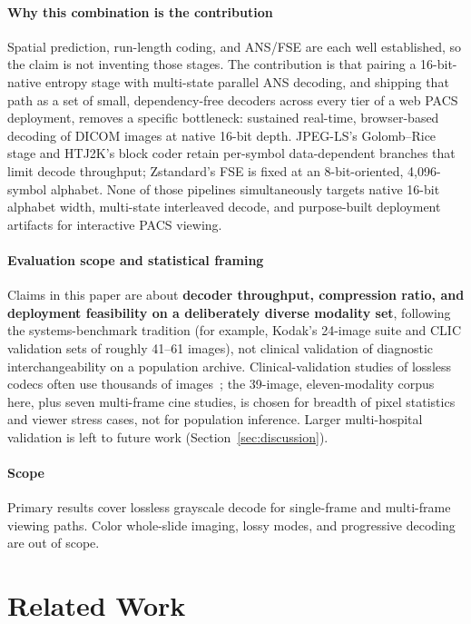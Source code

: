 \documentclass[journal]{IEEEtran}
\begin{document}
\paragraph{Why this combination is the contribution}
Spatial prediction, run-length coding, and ANS/FSE are each well established,
so the claim is not inventing those stages. The contribution is that pairing a
16-bit-native entropy stage with multi-state parallel ANS decoding, and
shipping that path as a set of small, dependency-free decoders across every
tier of a web PACS deployment, removes a specific bottleneck: sustained
real-time, browser-based decoding of DICOM images at native 16-bit depth.
JPEG-LS's Golomb--Rice stage and HTJ2K's block coder retain per-symbol
data-dependent branches that limit decode throughput; Zstandard's FSE is fixed
at an 8-bit-oriented, 4,096-symbol alphabet. None of those pipelines
simultaneously targets native 16-bit alphabet width, multi-state interleaved
decode, and purpose-built deployment artifacts for interactive PACS viewing.

\paragraph{Evaluation scope and statistical framing}
Claims in this paper are about \textbf{decoder throughput, compression ratio,
and deployment feasibility on a deliberately diverse modality set}, following
the systems-benchmark tradition (for example, Kodak's 24-image suite and CLIC
validation sets of roughly 41--61 images), not clinical validation of
diagnostic interchangeability on a population archive. Clinical-validation
studies of lossless codecs often use thousands of
images~\cite{clunie2000}; the 39-image, eleven-modality corpus here, plus
seven multi-frame cine studies, is chosen for breadth of pixel statistics and
viewer stress cases, not for population inference. Larger multi-hospital
validation is left to future work (Section~\ref{sec:discussion}).

\paragraph{Scope} Primary results cover lossless grayscale decode for
single-frame and multi-frame viewing paths. Color whole-slide imaging, lossy
modes, and progressive decoding are out of scope.

\section{Related Work}
\label{sec:related}
\end{document}
